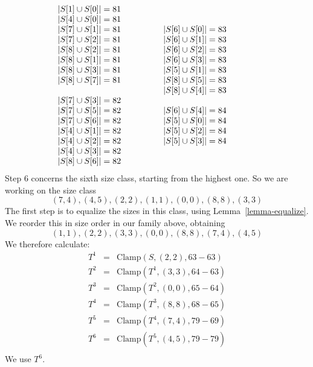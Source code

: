 \documentclass[12pt]{article}
\theoremstyle{definition}
\newcommand{\Update}{\mbox{Clamp}}
\begin{document}
\[\begin{array}[t]{l@{\qquad\qquad}l@{\qquad\qquad}l}
\begin{array}{l}
|S[1] \cup S[0]| = 81 \\
|S[4] \cup S[0]| = 81 \\
|S[7] \cup S[1]| = 81 \\
|S[7] \cup S[2]| = 81 \\
|S[8] \cup S[2]| = 81 \\
|S[8] \cup S[1]| = 81 \\
|S[8] \cup S[3]| = 81 \\
|S[8] \cup S[7]| = 81 \\
  \\
|S[7] \cup S[3]| = 82 \\
|S[7] \cup S[5]| = 82 \\
|S[7] \cup S[6]| = 82 \\
|S[4] \cup S[1]| = 82 \\
|S[4] \cup S[2]| = 82 \\
|S[4] \cup S[3]| = 82 \\
|S[8] \cup S[6]| = 82 \\
 \end{array}
 &
  \begin{array}{l}
|S[6] \cup S[0]| = 83 \\
|S[6] \cup S[1]| = 83 \\
|S[6] \cup S[2]| = 83 \\
|S[6] \cup S[3]| = 83 \\
|S[5] \cup S[1]| = 83 \\
|S[8] \cup S[5]| = 83 \\
|S[8] \cup S[4]| = 83 \\
  \\
|S[6] \cup S[4]| = 84 \\
|S[5] \cup S[0]| = 84 \\
|S[5] \cup S[2]| = 84 \\
|S[5] \cup S[3]| = 84 \\
 \end{array} 
 \end{array}
 \]
Step $6$ concerns the sixth size class, starting from the highest one.
So  we are working on the size class 
 \[  (7,4),(4,5),(2, 2),(1,1),(0,0),(8,8), (3,3)
 \]
 The first step is to equalize the sizes in this class, using Lemma~\ref{lemma-equalize}.
 We reorder this in size order in our family above, obtaining
  \[  (1,1), (2, 2), (3,3),  (0,0),(8,8), (7,4),(4,5)
 \]
 We therefore calculate:
\[ \begin{array}{lcl}
 T^1  & = &  \Update(S,(2,2), 63-63)\\

T^2 & = & \Update(T^1,(3,3),  64-63)\\

T^{3} & = & \Update(T^{2}, (0,0), 65-64 )\\
T^{4} & = & \Update(T^{3}, (8,8), 68-65 )\\
T^{5} & = & \Update(T^4, (7,4),79-69 )\\
T^{6} & = & \Update(T^{5}, (4,5), 79-79)\\
\end{array}
\]
 We use $T^6$.
 
\end{document}
